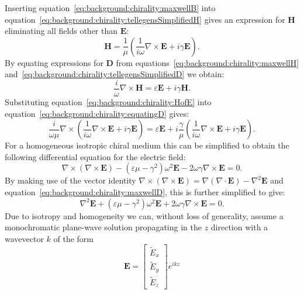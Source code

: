 Inserting equation~\ref{eq:background:chirality:maxwellB} into equation~\ref{eq:background:chirality:tellegensSimplifiedH} gives an expression for $\mathbf{H}$ eliminating all fields other than $\mathbf{E}$:
\begin{equation}\label{eq:background:chirality:HofE}
    \mathbf{H} = \frac{1}{\mu} \left( \frac{1}{i \omega} \nabla \times \mathbf{E} + i \gamma \mathbf{E} \right).
\end{equation}
By equating expressions for $\mathbf{D}$ from equations~\ref{eq:background:chirality:maxwellH} and~\ref{eq:background:chirality:tellegensSimplifiedD} we obtain:
\begin{equation}\label{eq:background:chirality:equatingD}
    \frac{i}{\omega} \nabla \times \mathbf{H} = \varepsilon \mathbf{E} + i \gamma \mathbf{H}.
\end{equation}
Substituting equation~\ref{eq:background:chirality:HofE} into equation~\ref{eq:background:chirality:equatingD} gives:
\begin{equation}\label{eq:background:chirality:diffEfull}
    \frac{i}{\omega \mu} \nabla \times \left( \frac{1}{i \omega} \nabla \times \mathbf{E} + i \gamma \mathbf{E} \right) = \varepsilon \mathbf{E} + i \frac{\gamma}{\mu} \left( \frac{1}{i \omega} \nabla \times \mathbf{E} + i \gamma \mathbf{E} \right).
\end{equation}
For a homogeneous isotropic chiral medium this can be simplified to obtain the following differential equation for the electric field:
\begin{equation}\label{eq:background:chirality:diffEreduced}
    \nabla \times (\nabla \times \mathbf{E}) - (\varepsilon \mu - \gamma^2)\omega^2 \mathbf{E} - 2 \omega \gamma \nabla \times \mathbf{E} = 0.
\end{equation}
By making use of the vector identity $\nabla \times (\nabla \times \mathbf{E}) = \nabla(\nabla \cdot \mathbf{E}) - \nabla^2 \mathbf{E}$ and equation~\ref{eq:background:chirality:maxwellD}, this is further simplified to give:
\begin{equation}\label{eq:background:chirality:diffE}
    \nabla^2 \mathbf{E} + (\varepsilon \mu - \gamma^2)\omega^2 \mathbf{E} + 2 \omega \gamma \nabla \times \mathbf{E} = 0.
\end{equation}
Due to isotropy and homogeneity we can, without loss of generality, assume a monochromatic plane-wave solution propagating in the $z$ direction with a wavevector $k$ of the form
\begin{equation}
    \mathbf{E} = \begin{bmatrix}
        \tilde E_x \\
        \tilde E_y \\
        \tilde E_z
      \end{bmatrix} e^{i k z}
\end{equation}
